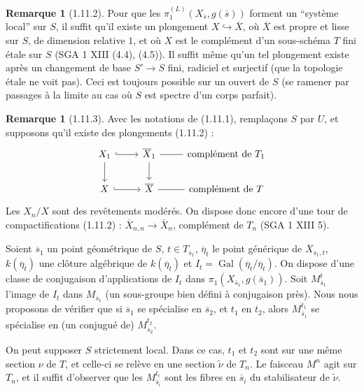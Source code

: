 \documentclass[12pt,a4paper]{article}
\theoremstyle{plain}
\theoremstyle{definition}
\newtheorem{remark}[theorem]{Remarque}
\theoremstyle{remark}
\DeclareMathOperator{\Gal}{Gal}
\begin{document}
\begin{remark}[1.11.2]
Pour que les $\pi_1^{(L)}(X_{\overline{s}}, g(\overline{s}))$ forment un ``syst\`eme local'' sur $S$, il suffit qu'il existe un plongement $X \hookrightarrow \overline{X}$, o\`u $\overline{X}$ est propre et lisse sur $S$, de dimension relative $1$, et o\`u $X$ est le compl\'ement d'un sous-sch\'ema $T$ fini \'etale sur $S$ (SGA 1 XIII (4.4), (4.5)). Il suffit m\^eme qu'un tel plongement existe apr\`es un changement de base $S' \to S$ fini, radiciel et surjectif (que la topologie \'etale ne voit pas). Ceci est toujours possible sur un ouvert de $S$ (se ramener par passages \`a la limite au cas o\`u $S$ est spectre d'un corps parfait).
\end{remark}

\begin{remark}[1.11.3]
Avec les notations de (1.11.1), rempla\c{c}ons $S$ par $U$, et supposons qu'il existe des plongements (1.11.2) :
\[
\begin{tikzcd}
X_1 \arrow[r, hook] \arrow[d] & \overline{X}_1 \arrow[d] \arrow[r, no head] & \text{compl\'ement de }T_1 \\
X \arrow[r, hook] & \overline{X} \arrow[r, no head] & \text{compl\'ement de }T
\end{tikzcd}
\]
Les $X_n/X$ sont des rev\^etements mod\'er\'es. On dispose donc encore d'une tour de compactifications (1.11.2) : $\overline{X}_{n,n} \to \overline{X}_n$, compl\'ement de $T_n$ (SGA 1 XIII 5).

Soient $\overline{s}_1$ un point g\'eom\'etrique de $S$, $t \in T_{\overline{s}_1}$, $\overline{\eta}_t$ le point g\'en\'erique de $\overline{X}_{\overline{s}_1,t}$, $k(\overline{\eta}_t)$ une cl\^oture alg\'ebrique de $k(\overline{\eta}_t)$ et $I_t = \Gal(\overline{\eta}_t/\overline{\eta}_t)$. On dispose d'une classe de conjugaison d'applications de $I_t$ dans $\pi_1(X_{\overline{s}_1}, g(\overline{s}_1))$. Soit $M_{\overline{s}_1}^t$ l'image de $I_t$ dans $M_{\overline{s}_1}$ (un sous-groupe bien d\'efini \`a conjugaison pr\`es). Nous nous proposons de v\'erifier que si $\overline{s}_1$ se sp\'ecialise en $\overline{s}_2$, et $t_1$ en $t_2$, alors $M_{\overline{s}_1}^{t_1}$ se sp\'ecialise en (un conjugu\'e de) $M_{\overline{s}_2}^{t_2}$.

On peut supposer $S$ strictement local. Dans ce cas, $t_1$ et $t_2$ sont sur une m\^eme section $\nu$ de $T$, et celle-ci se rel\`eve en une section $\widetilde{\nu}$ de $T_n$. Le faisceau $M^n$ agit sur $T_n$, et il suffit d'observer que les $M_{\overline{s}_i}^{t_i}$ sont les fibres en $\overline{s}_i$ du stabilisateur de $\widetilde{\nu}$.


\end{remark}
\end{document}
